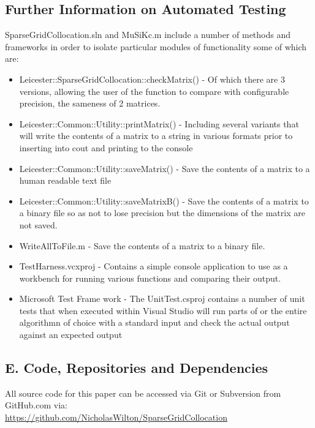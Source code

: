 \documentclass[a4paper]{amsart}
\begin{document}
\subsection{ Further Information on Automated Testing}

SparseGridCollocation.sln and MuSiKc.m include a number of methods and frameworks in order to isolate particular modules of functionality some of which are:
\begin{itemize}
\item Leicester::SparseGridCollocation::checkMatrix() - Of which there are 3 versions, allowing the user of the function to compare with configurable precision, the sameness of 2 matrices.
\item Leicester::Common::Utility::printMatrix() - Including several variants that will write the contents of a matrix to a string in various formats prior to inserting into cout and printing to the console
\item Leicester::Common::Utility::saveMatrix() - Save the contents of a matrix to a human readable text file
\item Leicester::Common::Utility::saveMatrixB() - Save the contents of a matrix to a binary file so as not to lose precision but the dimensions of the matrix are not saved.
\item WriteAllToFile.m - Save the contents of a matrix to a binary file.
\item TestHarness.vcxproj - Contains a simple console application to use as a workbench for running various functions and comparing their output.
\item Microsoft Test Frame work -  The UnitTest.csproj contains a number of unit tests that when executed within Visual Studio will run parts of or the entire algorithmn of choice with a standard input and check the actual output against an expected output
\end{itemize}
\subsection{E. Code, Repositories and Dependencies}

All source code for this paper can be accessed via Git or Subversion from GitHub.com via:\\
\url {https://github.com/NicholasWilton/SparseGridCollocation}\\
\end{document}
